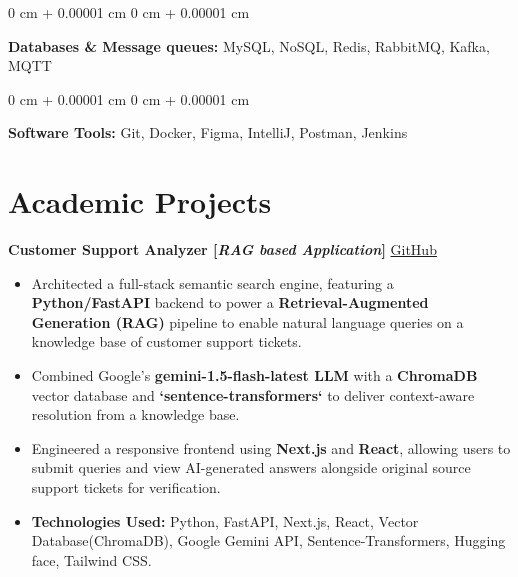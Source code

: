 \documentclass[10pt, letterpaper]{article}
\newenvironment{highlights}{
    \begin{itemize}[
        topsep=0.10 cm,     %
        parsep=0.10 cm,     %
        partopsep=0pt,      %
        itemsep=0pt,        %
        leftmargin=0 cm + 10pt  %
    ]
}{
    \end{itemize}
}
\newenvironment{onecolentry}{
    \begin{adjustwidth}{
        0 cm + 0.00001 cm
    }{
        0 cm + 0.00001 cm
    }
}{
    \end{adjustwidth}
}
\begin{document}
        \begin{onecolentry}
        \textbf{Databases \& Message queues:} MySQL, NoSQL, Redis, RabbitMQ, Kafka, MQTT \  %
        \end{onecolentry}
        
        \vspace{0.1 cm}
        
        \begin{onecolentry}
        \textbf{Software Tools:} Git, Docker, Figma, IntelliJ, Postman, Jenkins \\  %
        \vspace{0.1 cm}
        \end{onecolentry}


    \section{Academic Projects}

        \noindent
        \textbf{Customer Support Analyzer [\textit{RAG based Application}]} \hfill \href{https://github.com/tushar-fs/customer-support-analyzer}{\small \faGithub \space GitHub}
        
        \begin{highlights}
            \item Architected a full-stack semantic search engine, featuring a \textbf{Python/FastAPI} backend to power a \textbf{Retrieval-Augmented Generation (RAG)} pipeline to enable natural language queries on a knowledge base of customer support tickets.
            \item Combined Google's \textbf{gemini-1.5-flash-latest LLM} with a \textbf{ChromaDB} vector database and \textbf{`sentence-transformers`} to deliver context-aware resolution from a knowledge base.
            \item Engineered a responsive frontend using \textbf{Next.js} and \textbf{React}, allowing users to submit queries and view AI-generated answers alongside original source support tickets for verification.
            \item \textbf{Technologies Used:} Python, FastAPI, Next.js, React, Vector Database(ChromaDB), Google Gemini API, Sentence-Transformers, Hugging face, Tailwind CSS.
        \end{highlights}
\end{document}
